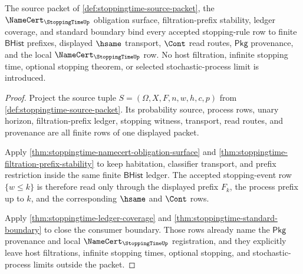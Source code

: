 \begin{theorem}
\label{thm:stoppingtime-scoped-dependency-envelope}
The source packet of \autoref{def:stoppingtime-source-packet}, the
$\NameCert_{\StoppingTimeUp}$ obligation surface, filtration-prefix stability,
ledger coverage, and standard boundary bind every accepted stopping-rule row
to finite $\mathsf{BHist}$ prefixes, displayed $\hsame$ transport, $\Cont$
read routes, $\mathsf{Pkg}$ provenance, and the local
$\NameCert_{\StoppingTimeUp}$ row. No host filtration, infinite stopping time,
optional stopping theorem, or selected stochastic-process limit is introduced.
\end{theorem}
\begin{proof}
Project the source tuple
$S=(\Omega,X,F,n,w,h,c,p)$ from
\autoref{def:stoppingtime-source-packet}. Its probability source, process
rows, unary horizon, filtration-prefix ledger, stopping witness, transport,
read routes, and provenance are all finite rows of one displayed packet.

Apply \autoref{thm:stoppingtime-namecert-obligation-surface} and
\autoref{thm:stoppingtime-filtration-prefix-stability} to keep habitation,
classifier transport, and prefix restriction inside the same finite
$\mathsf{BHist}$ ledger. The accepted stopping-event row $\{w\leq k\}$ is
therefore read only through the displayed prefix $F_k$, the process prefix up
to $k$, and the corresponding $\hsame$ and $\Cont$ rows.

Apply \autoref{thm:stoppingtime-ledger-coverage} and
\autoref{thm:stoppingtime-standard-boundary} to close the consumer boundary.
Those rows already name the $\mathsf{Pkg}$ provenance and local
$\NameCert_{\StoppingTimeUp}$ registration, and they explicitly leave host
filtrations, infinite stopping times, optional stopping, and stochastic-process
limits outside the packet.
\end{proof}

